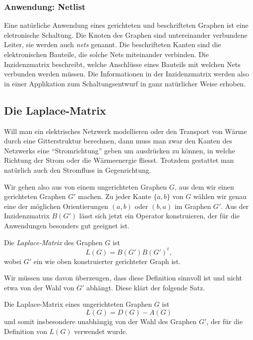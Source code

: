 \subsubsection{Anwendung: Netlist}
Eine natürliche Anwendung eines gerichteten und beschrifteten Graphen
ist eine eletronische Schaltung.
Die Knoten des Graphen sind untereinander verbundene Leiter, sie werden
auch {\em nets} genannt. 
Die beschrifteten Kanten sind die elektronischen Bauteile, die solche
Nets miteinander verbinden.
Die Inzidenzmatrix beschreibt, welche Anschlüsse eines Bauteils mit
welchen Nets verbunden werden müssen.
Die Informationen in der Inzidenzmatrix werden also in einer
Applikation zum Schaltungsentwurf in ganz natürlicher Weise erhoben.

\subsection{Die Laplace-Matrix
\label{subsection:laplace-matrix}}
Will man ein elektrisches Netzwerk modellieren oder den Transport
von Wärme durch eine Gitterstruktur berechnen, dann muss man zwar den
Kanten des Netzwerks eine ``Stromrichtung'' geben um ausdrücken zu können,
in welche Richtung der Strom oder die Wärmeenergie fliesst.
Trotzdem gestattet man natürlich auch den Stromfluss in Gegenrichtung.

Wir gehen also aus von einem ungerichteten Graphen $G$, aus dem
wir einen gerichteten Graphen $G'$ machen.
Zu jeder Kante $\{a,b\}$ von $G$ wählen wir genau eine der möglichen
Orientierungen $(a,b)$ oder $(b,a)$ im Graphen $G'$.
Aus der Inzidenzmatrix $B(G')$ lässt sich jetzt ein Operator konstruieren,
der für die Anwendungen besonders gut geeignet ist.

\begin{definition}
\label{buch:graphen:def:laplace-matrix}
Die {\em Laplace-Matrix} des Graphen $G$ ist
\[
L(G) = B(G')B(G')^t,
\]
wobei $G'$ ein wie oben konstruierter gerichteter Graph ist.
\end{definition}

Wir müssen uns davon überzeugen, dass diese Definition sinnvoll ist
und nicht etwa von der Wahl von $G'$ abhängt.
Diese klärt der folgende Satz.

\begin{satz}
Die Laplace-Matrix eines ungerichteten Graphen $G$ ist
\begin{equation}
L(G) = D(G) - A(G)
\label{buch:graphen:eqn:laplace-definition}
\end{equation}
und somit insbesondere unabhängig von der Wahl des Graphen $G'$,
der für die Definition von $L(G)$ verwendet wurde.
\end{satz}

